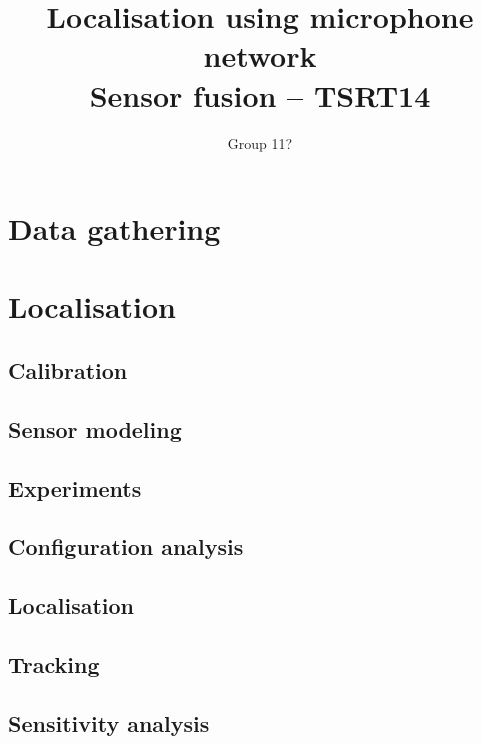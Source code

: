 \documentclass[10pt,a4paper]{report}
\begin{document}
\title{Localisation using microphone network\\Sensor fusion -- TSRT14}
\author{Group 11?}
\maketitle



\tableofcontents

\newpage
\chapter{Data gathering}
\label{Data gathering}

\newpage
\chapter{Localisation}
\label{Data gathering}

\newpage
\section{Calibration}
\label{Localisation}

\newpage
\section{Sensor modeling}
\label{Sensor modeling}

\newpage
\section{Experiments}
\label{Experiments}

\newpage
\section{Configuration analysis}
\label{Configuration analysis}

\newpage
\section{Localisation}
\label{Localisationg}

\newpage
\section{Tracking}
\label{Tracking}

\newpage
\section{Sensitivity analysis}
\label{Sensitivity analysis}
\end{document}
